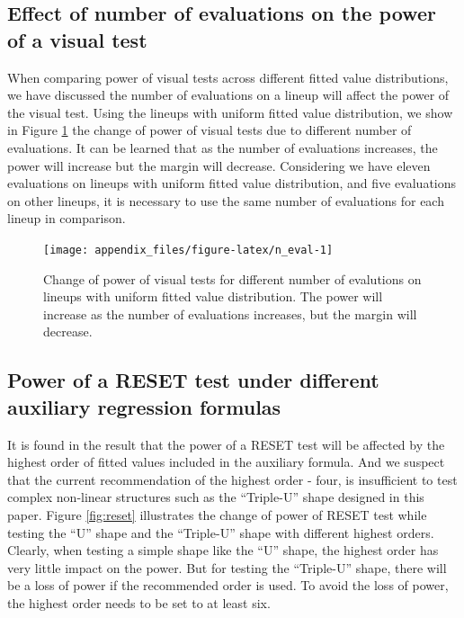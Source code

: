 \documentclass[]{interact}
\theoremstyle{plain}%
\theoremstyle{definition}
\theoremstyle{remark}
\begin{document}
\hypertarget{effect-of-number-of-evaluations-on-the-power-of-a-visual-test}{%
\subsection{Effect of number of evaluations on the power of a visual
test}\label{effect-of-number-of-evaluations-on-the-power-of-a-visual-test}}

When comparing power of visual tests across different fitted value
distributions, we have discussed the number of evaluations on a lineup
will affect the power of the visual test. Using the lineups with uniform
fitted value distribution, we show in Figure \ref{fig:n_eval} the change
of power of visual tests due to different number of evaluations. It can
be learned that as the number of evaluations increases, the power will
increase but the margin will decrease. Considering we have eleven
evaluations on lineups with uniform fitted value distribution, and five
evaluations on other lineups, it is necessary to use the same number of
evaluations for each lineup in comparison.

\begin{figure}

{\centering \texttt{[image: appendix\_files/figure-latex/n\_eval-1]} 

}

\caption{Change of power of visual tests for different number of evalutions on lineups with uniform fitted value distribution. The power will increase as the number of evaluations increases, but the margin will decrease.}\label{fig:n_eval}
\end{figure}

\hypertarget{power-of-a-reset-test-under-different-auxiliary-regression-formulas}{%
\subsection{Power of a RESET test under different auxiliary regression
formulas}\label{power-of-a-reset-test-under-different-auxiliary-regression-formulas}}

It is found in the result that the power of a RESET test will be
affected by the highest order of fitted values included in the auxiliary
formula. And we suspect that the current recommendation of the highest
order - four, is insufficient to test complex non-linear structures such
as the ``Triple-U'' shape designed in this paper. Figure \ref{fig:reset}
illustrates the change of power of RESET test while testing the ``U''
shape and the ``Triple-U'' shape with different highest orders. Clearly,
when testing a simple shape like the ``U'' shape, the highest order has
very little impact on the power. But for testing the ``Triple-U'' shape,
there will be a loss of power if the recommended order is used. To avoid
the loss of power, the highest order needs to be set to at least six.
\end{document}
